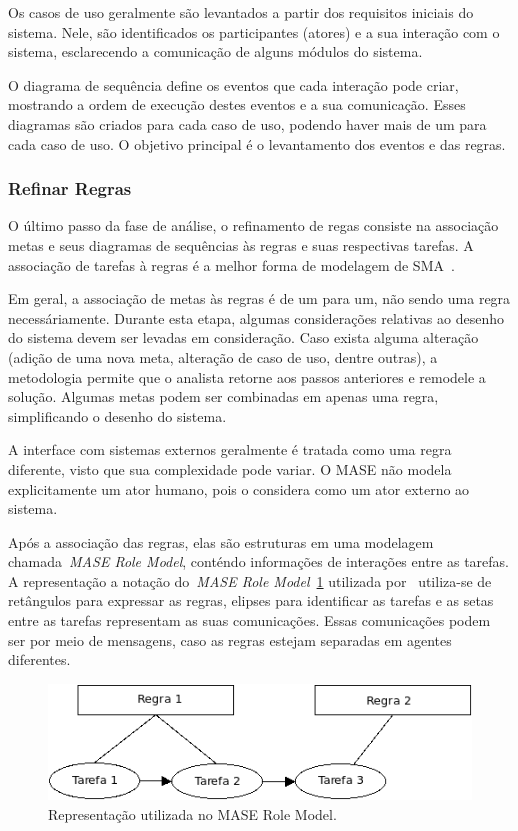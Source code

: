 Os casos de uso geralmente são levantados a partir dos requisitos iniciais do sistema. Nele, são identificados os participantes (atores) e a sua interação com o sistema, esclarecendo a comunicação de alguns módulos do sistema.

O diagrama de sequência define os eventos que cada interação pode criar, mostrando a ordem de execução destes eventos e a sua comunicação. Esses diagramas são criados para cada caso de uso, podendo haver mais de um para cada caso de uso. O objetivo principal é o levantamento dos eventos e das regras.

\subsubsection{Refinar Regras}

O último passo da fase de análise, o refinamento de regas consiste na associação metas e seus diagramas de sequências às regras e suas respectivas tarefas. A associação de tarefas à regras é a melhor forma de modelagem de SMA~\cite{scott01}. 

Em geral, a associação de metas às regras é de um para um, não sendo uma regra necessáriamente. Durante esta etapa, algumas considerações relativas ao desenho do sistema devem ser levadas em consideração. Caso exista alguma alteração (adição de uma nova meta, alteração de caso de uso, dentre outras), a metodologia permite que o analista retorne aos passos anteriores e remodele a solução. Algumas metas podem ser combinadas em apenas uma regra, simplificando o desenho do sistema.

A interface com sistemas externos geralmente é tratada como uma regra diferente, visto que sua complexidade pode variar. O MASE não modela explicitamente um ator humano, pois o considera como um ator externo ao sistema.

Após a associação das regras, elas são estruturas em uma modelagem chamada~\emph{MASE Role Model}, conténdo informações de interações entre as tarefas. A representação a notação do~\emph{MASE Role Model}~\ref{fig:exemplo-mase-role-model} utilizada por~\cite{scott01} utiliza-se de retângulos para expressar as regras, elipses para identificar as tarefas e as setas entre as tarefas representam as suas comunicações. Essas comunicações podem ser por meio de mensagens, caso as regras estejam separadas em agentes diferentes.

\begin{figure}
	\centering
	\includegraphics[scale=0.65]{images/exemplo-mase-role-model.png}
	\caption{Representação utilizada no MASE Role Model.}
	\label{fig:exemplo-mase-role-model}
\end{figure}

